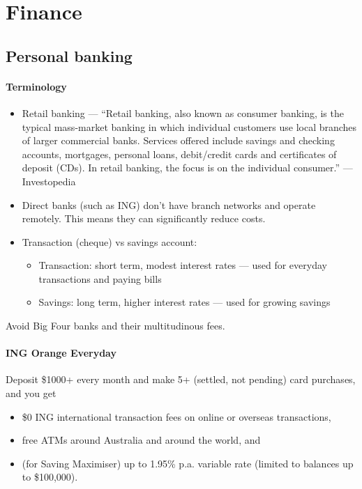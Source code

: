 \chapter{Finance}

\section{Personal banking}

\subsubsection{Terminology}
\begin{itemize}
	\item Retail banking --- ``Retail banking, also known as consumer banking, is the typical mass-market banking in which individual customers use local branches of larger commercial banks. Services offered include savings and checking accounts, mortgages, personal loans, debit/credit cards and certificates of deposit (CDs). In retail banking, the focus is on the individual consumer.'' --- Investopedia \cite{investopedia_retail_banking}
	\item Direct banks (such as ING) don't have branch networks and operate remotely. This means they can significantly reduce costs.
	\item Transaction (cheque) vs savings account:
	\begin{itemize}
		\item Transaction: short term, modest interest rates --- used for everyday transactions and paying bills
		\item Savings: long term, higher interest rates --- used for growing savings
	\end{itemize}
\end{itemize}

Avoid Big Four banks and their multitudinous fees.

\subsubsection{ING Orange Everyday}
Deposit \$1000+ every month and make 5+ (settled, not pending) card purchases, and you get
\begin{itemize}
	\item \$0 ING international transaction fees on online or overseas transactions,
	\item free ATMs around Australia and around the world, and
	\item (for Saving Maximiser) up to 1.95\% p.a. variable rate (limited to balances up to \$100,000).
\end{itemize}

